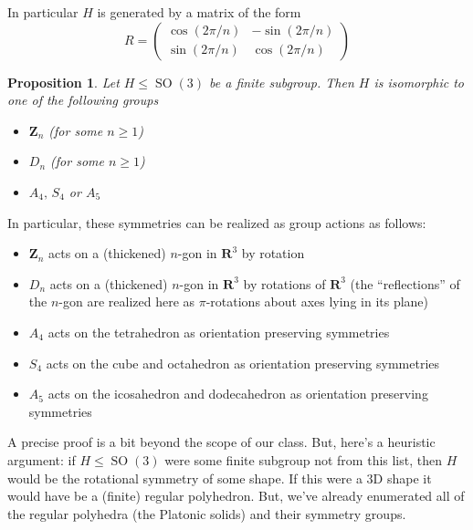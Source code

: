 \documentclass[12pt]{article}
\numberwithin{equation}{subsection}
\newtheorem{prop}[subsection]{Proposition}
\theoremstyle{note}
\newcommand{\SO}{\operatorname{SO}}
\begin{document}
In particular $H$ is generated by a matrix of the form \[ R=\begin{pmatrix} \cos(2\pi/n) & -\sin(2\pi/n) \\ \sin(2\pi/n) & \cos(2\pi/n) \end{pmatrix} \]

\begin{prop}
	Let $H\leq \SO(3)$ be a finite subgroup. Then $H$ is isomorphic to one of the following groups \begin{itemize}
		\item $\mathbf{Z}_n$ (for some $n\geq 1$)
		\item $D_n$ (for some $n\geq 1$)
		\item $A_4, \, S_4$ or $A_5$
	\end{itemize}
\end{prop}

In particular, these symmetries can be realized as group actions as follows: \begin{itemize}
	\item $\mathbf{Z}_n$ acts on a (thickened) $n$-gon in $\mathbf{R}^3$ by rotation 
	\item $D_n$ acts on a (thickened) $n$-gon in $\mathbf{R}^3$ by rotations of $\mathbf{R}^3$ (the ``reflections'' of the $n$-gon are realized here as $\pi$-rotations about axes lying in its plane)
	\item $A_4$ acts on the tetrahedron as orientation preserving symmetries
	\item $S_4$ acts on the cube and octahedron as orientation preserving symmetries
	\item $A_5$ acts on the icosahedron and dodecahedron as orientation preserving symmetries
\end{itemize}

A precise proof is a bit beyond the scope of our class. But, here's a heuristic argument: if $H\leq \SO(3)$ were some finite subgroup not from this list, then $H$ would be the rotational symmetry of some shape. If this were a 3D shape it would have be a (finite) regular polyhedron. But, we've already enumerated all of the regular polyhedra (the Platonic solids) and their symmetry groups. 
\end{document}
